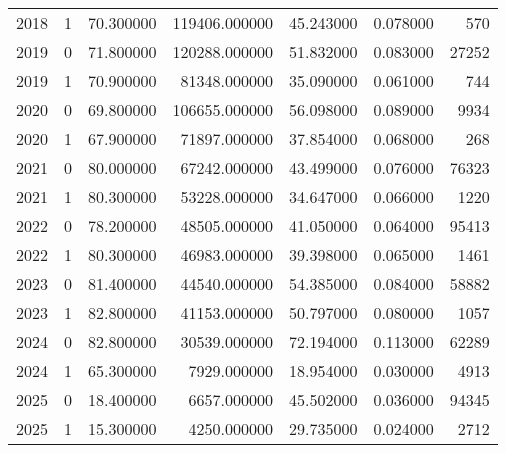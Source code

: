 \begin{tabular}{rrrrrrr}
2018 & 1 & 70.300000 & 119406.000000 & 45.243000 & 0.078000 & 570 \\
2019 & 0 & 71.800000 & 120288.000000 & 51.832000 & 0.083000 & 27252 \\
2019 & 1 & 70.900000 & 81348.000000 & 35.090000 & 0.061000 & 744 \\
2020 & 0 & 69.800000 & 106655.000000 & 56.098000 & 0.089000 & 9934 \\
2020 & 1 & 67.900000 & 71897.000000 & 37.854000 & 0.068000 & 268 \\
2021 & 0 & 80.000000 & 67242.000000 & 43.499000 & 0.076000 & 76323 \\
2021 & 1 & 80.300000 & 53228.000000 & 34.647000 & 0.066000 & 1220 \\
2022 & 0 & 78.200000 & 48505.000000 & 41.050000 & 0.064000 & 95413 \\
2022 & 1 & 80.300000 & 46983.000000 & 39.398000 & 0.065000 & 1461 \\
2023 & 0 & 81.400000 & 44540.000000 & 54.385000 & 0.084000 & 58882 \\
2023 & 1 & 82.800000 & 41153.000000 & 50.797000 & 0.080000 & 1057 \\
2024 & 0 & 82.800000 & 30539.000000 & 72.194000 & 0.113000 & 62289 \\
2024 & 1 & 65.300000 & 7929.000000 & 18.954000 & 0.030000 & 4913 \\
2025 & 0 & 18.400000 & 6657.000000 & 45.502000 & 0.036000 & 94345 \\
2025 & 1 & 15.300000 & 4250.000000 & 29.735000 & 0.024000 & 2712 \\
\bottomrule
\end{tabular}
